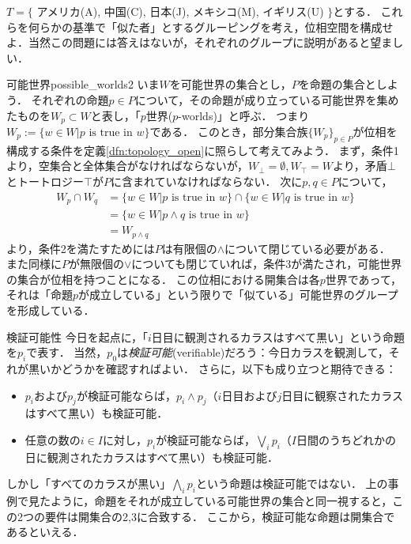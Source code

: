 \documentclass[11pt,a4paper, dvipdfmx]{jsarticle}
\begin{document}
\begin{renshu}{}{}
 $T = \{$ アメリカ(A), 中国(C), 日本(J), メキシコ(M), イギリス(U) $\}$とする．
これらを何らかの基準で「似た者」とするグルーピングを考え，位相空間を構成せよ．当然この問題には答えはないが，それぞれのグループに説明があると望ましい．
\end{renshu}


\begin{rei}{可能世界}{possible_worlds2}
いま$W$を可能世界の集合とし，$P$を命題の集合としよう．
それぞれの命題$p \in P$について，その命題が成り立っている可能世界を集めたものを$W_p \subset W$と表し，「$p$世界($p$-worlds)」と呼ぶ．
つまり$W_p := \{ w \in W | p \text{ is true in } w \}$である．
このとき，部分集合族$\{ W_p \}_{p \in P}$が位相を構成する条件を定義\ref{dfn:topology_open}に照らして考えてみよう．
まず，条件1より，空集合と全体集合がなければならないが，$W_{\bot} = \emptyset, W_{\top}=W$より，矛盾$\bot$とトートロジー$\top$が$P$に含まれていなければならない．
次に$p, q \in P$について，
\begin{align*}
W_p \cap W_q &=  \{ w \in W | p \text{ is true in } w \} \cap \{ w \in W | q \text{ is true in } w \} \\
&= \{ w \in W | p \wedge q \text{ is true in } w \} \\
&= W_{p \wedge q}
\end{align*}
より，条件2を満たすためには$P$は有限個の$\wedge$について閉じている必要がある．
また同様に$P$が無限個の$\vee$についても閉じていれば，条件3が満たされ，可能世界の集合が位相を持つことになる．
この位相における開集合は各$p$世界であって，それは「命題$p$が成立している」という限りで「似ている」可能世界のグループを形成している．
\end{rei}

\begin{rei}{検証可能性}{}  
  今日を起点に，「$i$日目に観測されるカラスはすべて黒い」という命題を$p_i$で表す．
  当然，$p_0$は\emph{検証可能}(verifiable)だろう：今日カラスを観測して，それが黒いかどうかを確認すればよい．
  さらに，以下も成り立つと期待できる：
  \begin{itemize}
   \item $p_i$および$p_j$が検証可能ならば，$p_i \wedge p_j$（$i$日目および$j$日目に観察されたカラスはすべて黒い）も検証可能．
   \item 任意の数の$i \in I$に対し，$p_i$が検証可能ならば，$\bigvee_i p_i$（$I$日間のうちどれかの日に観測されたカラスはすべて黒い）も検証可能．
  \end{itemize}
  しかし「すべてのカラスが黒い」$\bigwedge_i p_i$という命題は検証可能ではない．
  上の事例で見たように，命題をそれが成立している可能世界の集合と同一視すると，この2つの要件は開集合の2,3に合致する．
  ここから，検証可能な命題は開集合であるといえる\citep{Kelly1996-hl,Genin2018-fr}．
  \end{rei}
  
\end{document}

